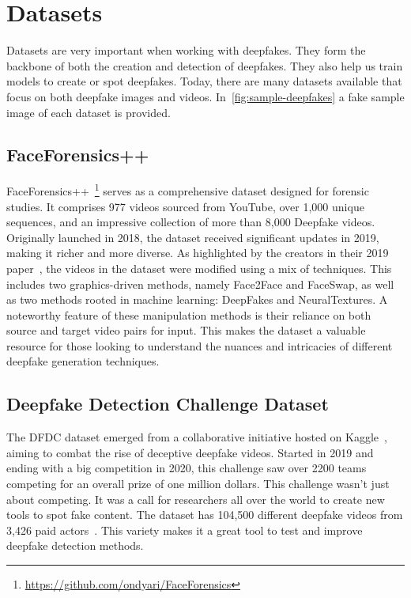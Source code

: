 \section{Datasets}
Datasets are very important when working with deepfakes. They form the backbone of both
the creation and detection of deepfakes. They also help us train models to create or spot
deepfakes. Today, there are many datasets available that focus on both deepfake images
and videos. In~\autoref{fig:sample-deepfakes} a fake sample image of each dataset is provided.

\subsection{FaceForensics++}\label{section:ff++}
FaceForensics++~\footnote{\url{https://github.com/ondyari/FaceForensics}} serves as a comprehensive dataset designed for forensic studies. It
comprises 977 videos sourced from YouTube, over 1,000 unique sequences, and an
impressive collection of more than 8,000 Deepfake videos. Originally launched in
2018, the dataset received significant updates in 2019, making it richer and more
diverse. As highlighted by the creators in their 2019 paper~\cite{roessler2019faceforensicspp},
the videos in the dataset were modified using a mix of techniques. This includes two
graphics-driven methods, namely Face2Face and FaceSwap, as well as two methods rooted
in machine learning: DeepFakes and NeuralTextures. A noteworthy feature of these
manipulation methods is their reliance on both source and target video pairs for input.
This makes the dataset a valuable resource for those looking to understand the
nuances and intricacies of different deepfake generation techniques.

\subsection{Deepfake Detection Challenge Dataset}
The \ac{DFDC} dataset emerged from a collaborative initiative hosted on Kaggle~\cite{kaggle2020},
aiming to combat the rise of deceptive deepfake videos. Started in 2019 and ending
with a big competition in 2020, this challenge saw over 2200 teams competing for an
overall prize of one million dollars. This challenge wasn't just about competing.
It was a call for researchers all over the world to create new tools to spot fake
content. The dataset has 104,500 different deepfake videos from 3,426 paid
actors~\cite{dolhansky2020deepfake}. This variety makes it a great tool to test and improve deepfake detection
methods.

